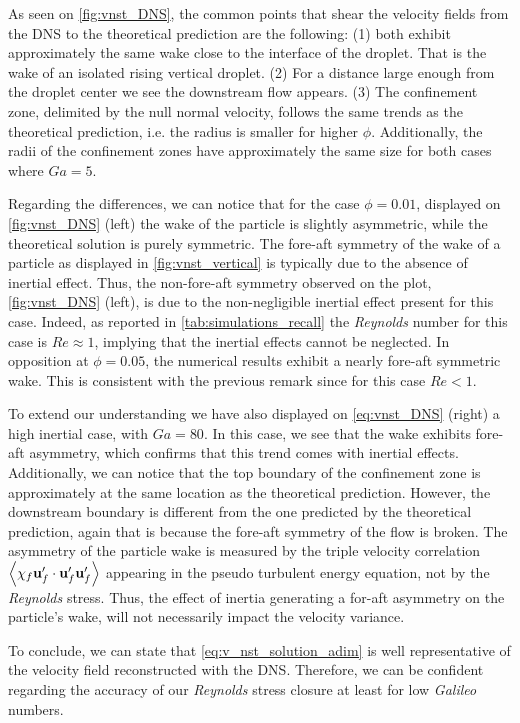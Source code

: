 As seen on \ref{fig:vnst_DNS}, the common points that shear the velocity fields from the DNS to the theoretical prediction are the following: 
(1) both exhibit approximately the same wake close to the interface of the droplet. 
That is the wake of an isolated rising vertical droplet. 
(2) For a distance large enough from the droplet center we see the downstream flow appears.
(3) The confinement zone, delimited by the null normal velocity, follows the same trends as the theoretical prediction, i.e. the radius is smaller for higher $\phi$. 
Additionally, the radii of the confinement zones have approximately the same size for both cases where $Ga = 5$. 

Regarding the differences, we can notice that for the case $\phi = 0.01$, displayed on \ref{fig:vnst_DNS} (left) the wake of the particle is slightly asymmetric, while the theoretical solution is purely symmetric. 
The fore-aft symmetry of the wake of a particle as displayed in \ref{fig:vnst_vertical} is typically due to the absence of inertial effect. 
Thus, the non-fore-aft symmetry observed on the plot, \ref{fig:vnst_DNS} (left), is due to the non-negligible inertial effect present for this case. 
Indeed, as reported in \ref{tab:simulations_recall} the \textit{Reynolds} number for this case is $Re \approx 1$, implying that the inertial effects cannot be neglected. 
In opposition at $\phi = 0.05$, the numerical results exhibit a nearly fore-aft symmetric wake. 
This is consistent with the previous remark since for this case $Re < 1$. 

To extend our understanding we have also displayed on \ref{eq:vnst_DNS} (right) a high inertial case, with  $Ga = 80$. 
In this case, we see that the wake exhibits fore-aft asymmetry, which confirms that this trend comes with inertial effects. 
Additionally, we can notice that the top boundary of the confinement zone is approximately at the same location as the theoretical prediction. 
However, the downstream boundary is different from the one predicted by the theoretical prediction, again that is because the fore-aft symmetry of the flow is broken.  
The asymmetry of the particle wake is measured by the triple velocity correlation $\left<\chi_f\textbf{u}_f'\cdot \textbf{u}_f' \textbf{u}_f'\right>$ appearing in the pseudo turbulent energy equation, not by the \textit{Reynolds} stress. 
Thus, the effect of inertia generating a for-aft asymmetry on the particle's wake, will not necessarily impact the velocity variance. 


To conclude, we can state that \ref{eq:v_nst_solution_adim} is well representative of the velocity field reconstructed with the DNS. 
Therefore, we can be confident regarding the accuracy of our \textit{Reynolds} stress closure at least for low \textit{Galileo} numbers. 




